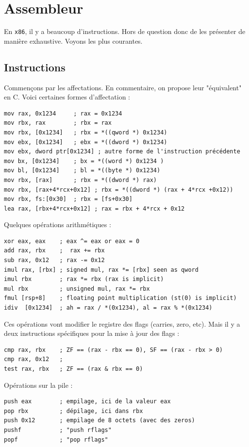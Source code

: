 \documentclass{book}
\newcommand{\xquatre}{{\tt x86}\xspace}
\begin{document}
\section{Assembleur}

En \xquatre, il y a beaucoup d'instructions. Hors de question  donc de les présenter de manière exhaustive. Voyons les plus courantes. 

\subsection{Instructions}
Commençons par les affectations. En commentaire, on propose leur "équivalent" en C. Voici certaines formes d'affectation :  
\begin{verbatim}
mov rax, 0x1234     ; rax = 0x1234
mov rbx, rax        ; rbx = rax
mov rbx, [0x1234]   ; rbx = *((qword *) 0x1234)
mov ebx, [0x1234]   ; ebx = *((dword *) 0x1234) 
mov ebx, dword ptr[0x1234] ; autre forme de l'instruction précédente
mov bx, [0x1234]    ; bx = *((word *) 0x1234 )
mov bl, [0x1234]    ; bl = *((byte *) 0x1234)
mov rbx, [rax]      ; rbx = *((dword *) rax)
mov rbx, [rax+4*rcx+0x12] ; rbx = *((dword *) (rax + 4*rcx +0x12))
mov rbx, fs:[0x30]  ; rbx = [fs+0x30]
lea rax, [rbx+4*rcx+0x12] ; rax = rbx + 4*rcx + 0x12
\end{verbatim}

Quelques opérations arithmétiques : 
\begin{verbatim}
xor eax, eax    ; eax ^= eax or eax = 0
add rax, rbx    ;  rax += rbx
sub rax, 0x12   ; rax -= 0x12
imul rax, [rbx] ; signed mul, rax *= [rbx] seen as qword 
imul rbx        ; rax *= rbx (rax is implicit) 
mul rbx         ; unsigned mul, rax *= rbx 
fmul [rsp+8]    ; floating point multiplication (st(0) is implicit)
idiv  [0x1234]  ; ah = rax / *(0x1234), al = rax % *(0x1234)
\end{verbatim}
Ces opérations vont modifier le registre des flags (carries, zero, etc). Mais il y a deux instructions spécifiques pour la mise à jour des flags : 
\begin{verbatim}
cmp rax, rbx    ; ZF == (rax - rbx == 0), SF == (rax - rbx > 0)
cmp rax, 0x12   ; 
test rax, rbx   ; ZF == (rax & rbx == 0)
\end{verbatim}


Opérations sur la pile : 
\begin{verbatim}
push eax        ; empilage, ici de la valeur eax
pop rbx         ; dépilage, ici dans rbx
push 0x12       ; empilage de 8 octets (avec des zeros)
pushf           ; "push rflags"
popf            ; "pop rflags"  
\end{verbatim}
\end{document}
